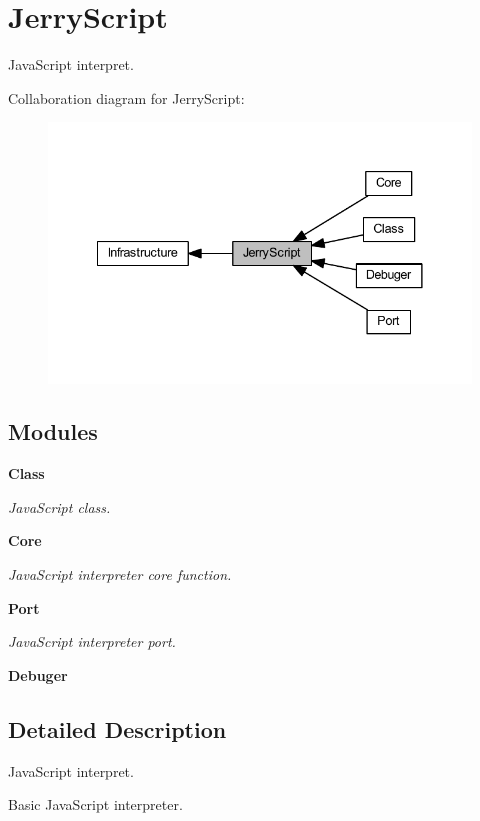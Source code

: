 \section{Jerry\+Script}
\label{group___jerry_script}


Java\+Script interpret.  


Collaboration diagram for Jerry\+Script\+:
\nopagebreak
\begin{figure}[H]
\begin{center}
\leavevmode
\includegraphics[width=341pt]{group___jerry_script}
\end{center}
\end{figure}
\subsection*{Modules}
\begin{DoxyCompactItemize}
\item 
\textbf{ Class}
\begin{DoxyCompactList}\small\item\em Java\+Script class. \end{DoxyCompactList}\item 
\textbf{ Core}
\begin{DoxyCompactList}\small\item\em Java\+Script interpreter core function. \end{DoxyCompactList}\item 
\textbf{ Port}
\begin{DoxyCompactList}\small\item\em Java\+Script interpreter port. \end{DoxyCompactList}\item 
\textbf{ Debuger}
\end{DoxyCompactItemize}


\subsection{Detailed Description}
Java\+Script interpret. 

Basic Java\+Script interpreter.